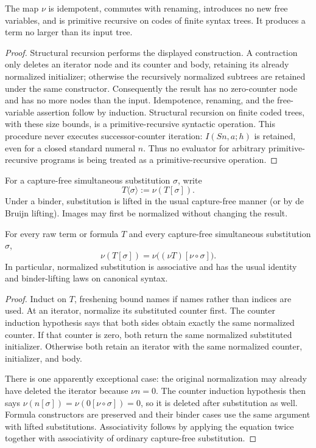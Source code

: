 \begin{lemma}
The map $\nu$ is idempotent, commutes with renaming, introduces no new free
variables, and is primitive recursive on codes of finite syntax trees.
It produces a term no larger than its input tree.
\end{lemma}
\begin{proof}
Structural recursion performs the displayed construction.  A contraction
only deletes an iterator node and its counter and body, retaining its
already normalized initializer; otherwise the recursively normalized
subtrees are retained under the same constructor.  Consequently the
result has no zero-counter node and has no more nodes than the input.
Idempotence, renaming, and the free-variable assertion follow by induction.
Structural recursion on finite coded trees, with these size bounds, is a
primitive-recursive syntactic operation.  This procedure never executes
successor-counter iteration: $I(Sn,a;h)$ is retained, even for a closed
standard numeral $n$.  Thus no evaluator for arbitrary primitive-recursive
programs is being treated as a primitive-recursive operation.
\end{proof}

For a capture-free simultaneous substitution $\sigma$, write
\[
 T\langle\sigma\rangle:=\nu(T[\sigma]).
\]
Under a binder, substitution is lifted in the usual capture-free manner
(or by de Bruijn lifting).  Images may first be normalized without changing
the result.

\begin{lemma}\label{zeroI:coherence}
For every raw term or formula $T$ and every capture-free simultaneous
substitution $\sigma$,
\[
 \nu(T[\sigma])=
 \nu\bigl((\nu T)[\nu\circ\sigma]\bigr).
\]
In particular, normalized substitution is associative and has the usual
identity and binder-lifting laws on canonical syntax.
\end{lemma}
\begin{proof}
Induct on $T$, freshening bound names if names rather than indices are
used.  At an iterator, normalize its substituted counter first.  The
counter induction hypothesis says that both sides obtain exactly the
same normalized counter.  If that counter is zero, both return the
same normalized substituted initializer.  Otherwise both retain an
iterator with the same normalized counter, initializer, and body.

There is one apparently exceptional case: the original normalization
may already have deleted the iterator because $\nu n=0$.  The counter
induction hypothesis then says
$\nu(n[\sigma])=\nu(0[\nu\circ\sigma])=0$, so it is deleted after
substitution as well.  Formula constructors are preserved and their
binder cases use the same argument with lifted substitutions.
Associativity follows by applying the equation twice together with
associativity of ordinary capture-free substitution.
\end{proof}


